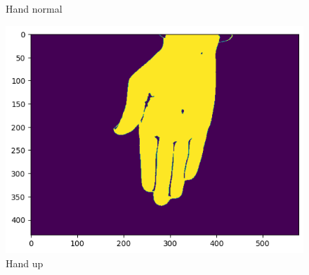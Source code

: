 \documentclass{report}
\begin{document}
\begin{figure}[H]
    \caption{Hand normal}
  \endminipage\hfill
    \includegraphics[width=\linewidth]{Images/hand_upHSV.png}
    \caption{Hand up}
  \endminipage\hfill
\end{figure}
\end{document}
